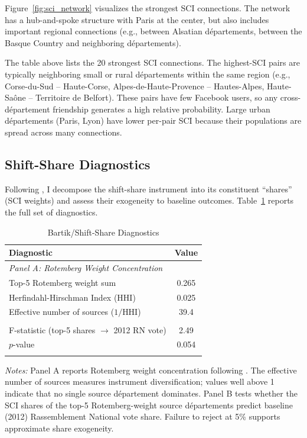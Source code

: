 \documentclass[12pt]{article}
\newcommand{\rn}{Rassemblement National}
\newcommand{\dept}{d\'{e}partement}
\newcommand{\depts}{d\'{e}partements}
\begin{document}
Figure~\ref{fig:sci_network} visualizes the strongest SCI connections. The network has a hub-and-spoke structure with Paris at the center, but also includes important regional connections (e.g., between Alsatian \depts{}, between the Basque Country and neighboring \depts{}).



The table above lists the 20 strongest SCI connections. The highest-SCI pairs are typically neighboring small or rural \depts{} within the same region (e.g., Corse-du-Sud -- Haute-Corse, Alpes-de-Haute-Provence -- Hautes-Alpes, Haute-Sa\^{o}ne -- Territoire de Belfort). These pairs have few Facebook users, so any cross-\dept{} friendship generates a high relative probability. Large urban \depts{} (Paris, Lyon) have lower per-pair SCI because their populations are spread across many connections.

\subsection{Shift-Share Diagnostics}

Following \citet{goldsmith2020bartik}, I decompose the shift-share instrument into its constituent ``shares'' (SCI weights) and assess their exogeneity to baseline outcomes. Table~\ref{tab:bartik_diagnostics} reports the full set of diagnostics.

\begin{table}[H]
\centering
\caption{Bartik/Shift-Share Diagnostics}
\label{tab:bartik_diagnostics}
\begin{tabular}{lc}
\toprule
\textbf{Diagnostic} & \textbf{Value} \\
\midrule
\multicolumn{2}{l}{\textit{Panel A: Rotemberg Weight Concentration}} \\
\addlinespace
Top-5 Rotemberg weight sum & 0.265 \\
Herfindahl-Hirschman Index (HHI) & 0.025 \\
Effective number of sources ($1/\text{HHI}$) & 39.4 \\
\addlinespace
\midrule
\multicolumn{2}{l}{\textit{Panel B: Share Exogeneity}} \\
\addlinespace
F-statistic (top-5 shares $\rightarrow$ 2012 RN vote) & 2.49 \\
$p$-value & 0.054 \\
\addlinespace
\bottomrule
\end{tabular}
\begin{minipage}{0.85\textwidth}
\vspace{0.3em}
\footnotesize\textit{Notes:} Panel A reports Rotemberg weight concentration following \citet{goldsmith2020bartik}. The effective number of sources measures instrument diversification; values well above 1 indicate that no single source \dept{} dominates. Panel B tests whether the SCI shares of the top-5 Rotemberg-weight source \depts{} predict baseline (2012) \rn{} vote share. Failure to reject at 5\% supports approximate share exogeneity.
\end{minipage}
\end{table}
\end{document}
